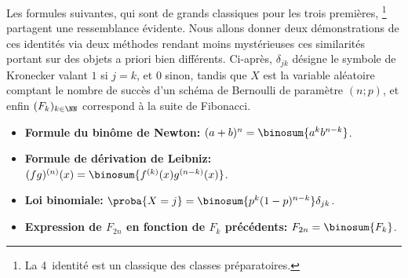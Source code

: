 Les formules suivantes, qui sont de grands classiques pour les trois premières,%
\footnote{
    La 4\ieme\ identité est un classique des classes préparatoires.
}
partagent une ressemblance évidente. Nous allons donner deux démonstrations de ces identités via deux méthodes rendant moins mystérieuses ces similarités portant sur des objets a priori bien différents.
%
Ci-après, 
$\delta_{jk}$ désigne le symbole de Kronecker valant $1$ si $j=k$, et $0$ sinon,
tandis que
$X$ est la variable aléatoire comptant le nombre de succès d'un schéma de Bernoulli de paramètre $(n ; p)$,
et enfin
$(F_k)_{k \in \NN}$ correspond à la suite de Fibonacci.
%
\begin{itemize}
    \item \textbf{Formule du binôme de Newton:}
    $(a + b)^n = \binosum{a^k b^{n-k}}$.


    \item \textbf{Formule de dérivation de Leibniz:}
    $(fg)^{(n)}(x) = \binosum{f^{(k)}(x) g^{(n-k)}(x)}$.


    \item \textbf{Loi binomiale:}
    $\proba{X = j} = \binosum{p^k (1 - p)^{n-k}} \delta_{jk}$.


    \item \textbf{\boldmath Expression de $F_{2n}$ en fonction de $F_k$ précédents:}
    $F_{2n} = \binosum{F_k}$.
\end{itemize}